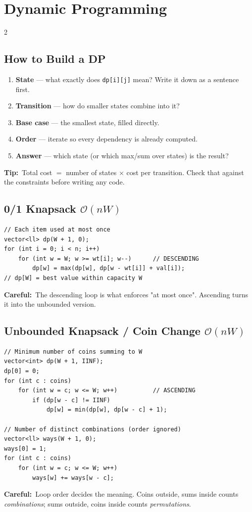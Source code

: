 \documentclass[10pt]{article}
\newcommand{\code}[1]{\texttt{\small #1}}
\newcommand{\sub}[2]{\subsection[#1]{#1\hspace{0.6em}%
  \textnormal{\color{accent2}\small$\mathcal{O}(#2)$}}}
\newcommand{\tip}[1]{{\color{tipc}\footnotesize\textbf{Tip:}}~{\footnotesize #1}\par}
\newcommand{\warn}[1]{{\color{warnc}\footnotesize\textbf{Careful:}}~{\footnotesize #1}\par}
\begin{document}
\section{Dynamic Programming}
\begin{multicols}{2}

\subsection{How to Build a DP}
\begin{enumerate}
    \item \textbf{State} --- what exactly does \code{dp[i][j]} mean?
          Write it down as a sentence first.
    \item \textbf{Transition} --- how do smaller states combine into it?
    \item \textbf{Base case} --- the smallest state, filled directly.
    \item \textbf{Order} --- iterate so every dependency is already
          computed.
    \item \textbf{Answer} --- which state (or which max/sum over states)
          is the result?
\end{enumerate}
\tip{Total cost $=$ number of states $\times$ cost per transition.
Check that against the constraints before writing any code.}

\sub{0/1 Knapsack}{nW}
\begin{lstlisting}
// Each item used at most once
vector<ll> dp(W + 1, 0);
for (int i = 0; i < n; i++)
    for (int w = W; w >= wt[i]; w--)      // DESCENDING
        dp[w] = max(dp[w], dp[w - wt[i]] + val[i]);
// dp[W] = best value within capacity W
\end{lstlisting}
\warn{The descending loop is what enforces "at most once". Ascending
turns it into the unbounded version.}

\sub{Unbounded Knapsack / Coin Change}{nW}
\begin{lstlisting}
// Minimum number of coins summing to W
vector<int> dp(W + 1, IINF);
dp[0] = 0;
for (int c : coins)
    for (int w = c; w <= W; w++)          // ASCENDING
        if (dp[w - c] != IINF)
            dp[w] = min(dp[w], dp[w - c] + 1);

// Number of distinct combinations (order ignored)
vector<ll> ways(W + 1, 0);
ways[0] = 1;
for (int c : coins)
    for (int w = c; w <= W; w++)
        ways[w] += ways[w - c];
\end{lstlisting}
\warn{Loop order decides the meaning. Coins outside, sums inside counts
\emph{combinations}; sums outside, coins inside counts
\emph{permutations}.}


\end{multicols}
\end{document}
